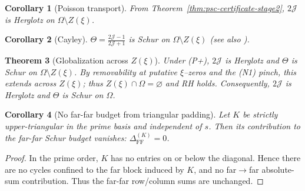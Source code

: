 \documentclass[11pt]{article}
\newtheorem{theorem}{Theorem}
\newtheorem{corollary}[theorem]{Corollary}
\theoremstyle{definition}
\theoremstyle{remark}
\begin{document}
\begin{corollary}[Poisson transport]\label{cor:poisson-herglotz}
From Theorem~\ref{thm:psc-certificate-stage2}, $2\mathcal J$ is Herglotz on $\Omega\setminus Z(\xi)$.
\end{corollary}

\begin{corollary}[Cayley]\label{cor:cayley-schur}
$\Theta=\frac{2\mathcal J-1}{2\mathcal J+1}$ is Schur on $\Omega\setminus Z(\xi)$ (see also \cite{RosenblumRovnyak,SarasonSubHardy}).
\end{corollary}
\begin{theorem}[Globalization across $Z(\xi)$]\label{thm:globalize-main}
Under (P+), $2\mathcal J$ is Herglotz and $\Theta$ is Schur on $\Omega\setminus Z(\xi)$. By removability at putative $\xi$--zeros and the (N1) pinch, this extends across $Z(\xi)$; thus $Z(\xi)\cap\Omega=\varnothing$ and RH holds. Consequently, $2\mathcal J$ is Herglotz and $\Theta$ is Schur on $\Omega$.
\end{theorem}
\begin{corollary}[No far-far budget from triangular padding]\label{cor:K-no-FF}
Let $K$ be strictly upper-triangular in the prime basis and independent of $s$. Then its contribution to the far-far Schur budget vanishes: $\Delta_{\mathrm{FF}}^{(K)}=0$.
\end{corollary}
\begin{proof}
In the prime order, $K$ has no entries on or below the diagonal. Hence there are no cycles confined to the far block induced by $K$, and no far$\to$far absolute-sum contribution. Thus the far-far row/column sums are unchanged.
\end{proof}
\end{document}
